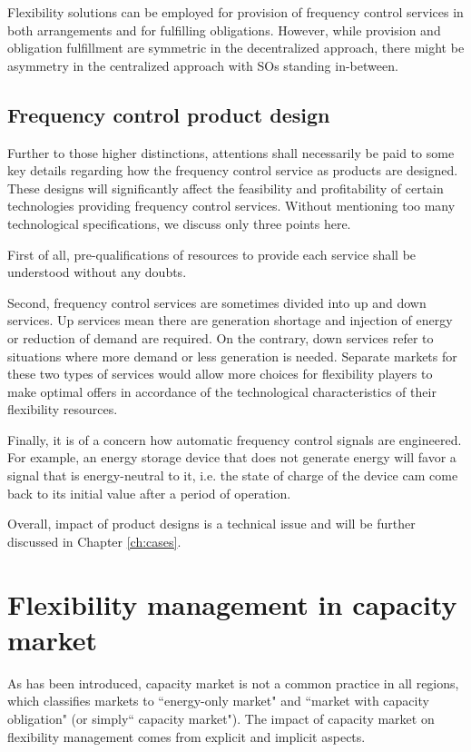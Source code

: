 Flexibility solutions can be employed for provision of frequency control services in both arrangements and for fulfilling obligations. However, while provision and obligation fulfillment are symmetric in the decentralized approach, there might be asymmetry in the centralized approach with SOs standing in-between. 

\subsection{Frequency control product design}
Further to those higher distinctions, attentions shall necessarily be paid to some key details regarding how the frequency control service as products are designed. These designs will significantly affect the feasibility and profitability of certain technologies providing frequency control services. Without mentioning too many technological specifications, we discuss only three points here. 

First of all, pre-qualifications of resources to provide each service shall be understood without any doubts.

Second, frequency control services are sometimes divided into up and down services. Up services mean there are generation shortage and injection of energy or reduction of demand are required. On the contrary, down services refer to situations where more demand or less generation is needed. Separate markets for these two types of services would allow more choices for flexibility players to make optimal offers in accordance of the technological characteristics of their flexibility resources.

Finally, it is of a concern how automatic frequency control signals are engineered. For example, an energy storage device that does not generate energy will favor a signal that is energy-neutral to it, i.e. the state of charge of the device cam come back to its initial value after a period of operation.

Overall, impact of product designs is a technical issue and will be further discussed in Chapter \ref{ch:cases}.

\section{Flexibility management in capacity market}
\label{sec:CM}
As has been introduced, capacity market is not a common practice in all regions, which classifies markets to ``energy-only market" and ``market with capacity obligation" (or simply`` capacity market"). The impact of capacity market on flexibility management comes from explicit and implicit aspects. 
